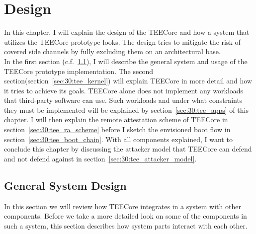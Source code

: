 \chapter{Design}
\label{sec:design}



In this chapter, I will explain the design of the TEECore and how a system that
utilizes the TEECore prototype looks. The design tries to mitigate the risk of
covered side channels by fully excluding them on an architectural base.\\

In the first section (c.f.~\ref{sec:30:tee_general}), I will describe the
general system and usage of the TEECore prototype implementation. The second
section(section~\ref{sec:30:tee_kernel}) will explain TEECore in more detail and
how it tries to achieve its goals. TEECore alone does not implement any
workloads that third-party software can use. Such workloads and under what
constraints they must be implemented will be explained by
section~\ref{sec:30:tee_apps} of this chapter. I will then explain the remote
attestation scheme of TEECore in section~\ref{sec:30:tee_ra_scheme} before I
sketch the envisioned boot flow in section~\ref{sec:30:tee_boot_chain}. With all
components explained, I want to conclude this chapter by discussing the attacker
model that TEECore can defend and not defend against in
section~\ref{sec:30:tee_attacker_model}.

\section{General System Design}
\label{sec:30:tee_general}
In this section we will review how TEECore integrates in a system with other
components. Before we take a more detailed look on some of the components in
such a system, this section describes how system parts interact with each other.

